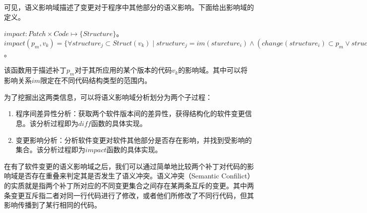 %	
%
%	

可见，语义影响域描述了变更对于程序中其他部分的语义影响。下面给出影响域的定义。

\begin{definition}
	$impact: Patch \times Code \mapsto \{Structure\}$。$impact(p_m, v_k) = \{ \forall structure_j \subset Struct(v_k) \mid structure_j = im(sturcture_i) \land (change(structure_i) \subset p_m \lor structure_i \subset impact(p_m,v_k)),structure_i,structure_j \subset Struct(v_k),v_k \subset Code,p_m \subset Pat(v_k), i,j,k,m \subset \mathbb{N} \}$。
\end{definition}

该函数用于描述补丁$p_m$对于其所应用的某个版本的代码$v_k$的影响域。其中可以将影响关系$im$限定在不同代码结构类型的范围内。

为了挖掘出这两类信息，可以将语义影响域分析划分为两个子过程：
\begin{enumerate}
	\item 程序间差异性分析：获取两个软件版本间的差异性，获得结构化的软件变更信息。该分析过程即为$diff$函数的具体实现。
	\item 变更影响分析：分析软件变更对软件其他部分是否存在影响，并找到受影响的集合。该分析过程即为$impact$函数的具体实现。
\end{enumerate}



在有了软件变更的语义影响域之后，我们可以通过简单地比较两个补丁对代码的影响域是否存在重叠来判定其是否发生了语义冲突。语义冲突（Semantic Confilict）的实质就是指两个补丁所对应的不同变更集合之间存在某两条互斥的变更。其中两条变更互斥指二者对同一行代码进行了修改，或者他们所修改了不同行代码，但其影响传播到了某行相同的代码。

%	



